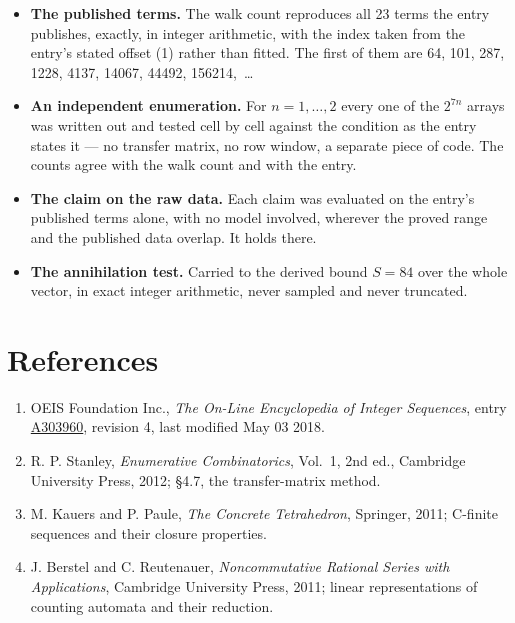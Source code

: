 \documentclass[11pt]{article}
\theoremstyle{definition}
\begin{document}
\begin{itemize}

\item {\bfseries The published terms.} The walk count reproduces all 23 terms the entry publishes, exactly, in integer arithmetic, with the index taken from the entry's stated offset (1) rather than fitted. The first of them are 64, 101, 287, 1228, 4137, 14067, 44492, 156214,~\dots

\item {\bfseries An independent enumeration.} For $n = 1,\dots,2$ every one of the $2^{7n}$ arrays was written out and tested cell by cell against the condition as the entry states it --- no transfer matrix, no row window, a separate piece of code. The counts agree with the walk count and with the entry.

\item {\bfseries The claim on the raw data.} Each claim was evaluated on the entry's published terms alone, with no model involved, wherever the proved range and the published data overlap. It holds there.

\item {\bfseries The annihilation test.} Carried to the derived bound $S = 84$ over the whole vector, in exact integer arithmetic, never sampled and never truncated.

\end{itemize}

\section{References}

\begin{enumerate}

\item OEIS Foundation Inc., \emph{The On-Line Encyclopedia of Integer Sequences}, entry \href{https://oeis.org/A303960}{A303960}, revision 4, last modified May 03 2018.

\item R. P. Stanley, \emph{Enumerative Combinatorics}, Vol.~1, 2nd ed., Cambridge University Press, 2012; \S4.7, the transfer-matrix method.

\item M. Kauers and P. Paule, \emph{The Concrete Tetrahedron}, Springer, 2011; C-finite sequences and their closure properties.

\item J. Berstel and C. Reutenauer, \emph{Noncommutative Rational Series with Applications}, Cambridge University Press, 2011; linear representations of counting automata and their reduction.

\end{enumerate}
\end{document}
